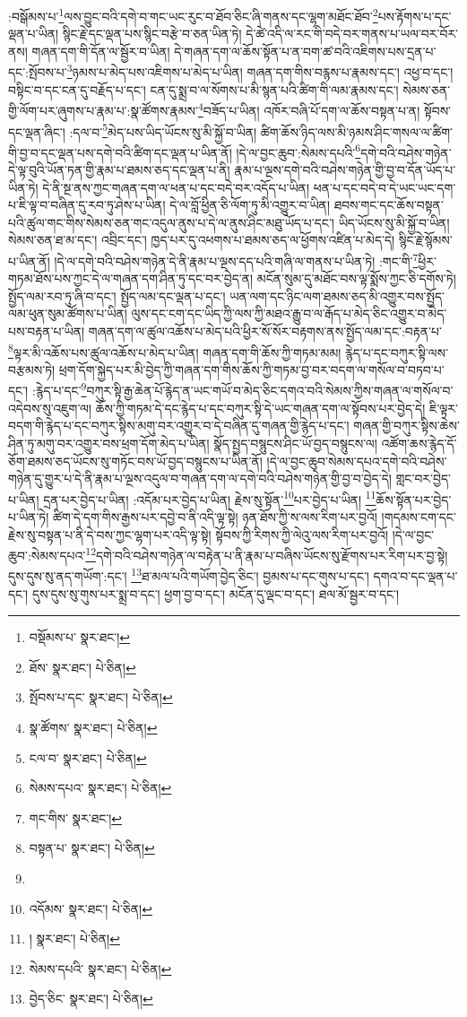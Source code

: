 :བསྒོམས་པ་\footnote{བསྡོམས་པ་  སྣར་ཐང་། }ལས་བྱུང་བའི་དགེ་བ་གང་ཡང་རུང་བ་ཐོབ་ཅིང་ཞི་གནས་དང་ལྷག་མཐོང་ཐོབ་\footnote{ཐོས་  སྣར་ཐང་།  པེ་ཅིན། }པས་རྟོགས་པ་དང་ལྡན་པ་ཡིན། སྙིང་རྗེ་དང་ལྡན་པས་སྙིང་བརྩེ་བ་ཅན་ཡིན་ཏེ། དེ་ཚེ་འདི་ལ་རང་གི་བདེ་བར་གནས་པ་ཡལ་བར་བོར་ནས། གཞན་དག་གི་དོན་ལ་སྦྱོར་བ་ཡིན། དེ་གཞན་དག་ལ་ཆོས་སྟོན་པ་ན་བག་ཚ་བའི་འཇིགས་པས་དྲན་པ་དང་:སྤོབས་པ་\footnote{སྤོབས་པ་དང་  སྣར་ཐང་།  པེ་ཅིན། }ཉམས་པ་མེད་པས་འཇིགས་པ་མེད་པ་ཡིན། གཞན་དག་གིས་བརྙས་པ་རྣམས་དང་། འཕྱ་བ་དང་། བསྟིང་བ་དང་ངན་དུ་བརྗོད་པ་དང་། ངན་དུ་སྨྲ་བ་ལ་སོགས་པ་མི་སྙན་པའི་ཚིག་གི་ལམ་རྣམས་དང་། སེམས་ཅན་གྱི་ལོག་པར་ཞུགས་པ་རྣམ་པ་:སྣ་ཚོགས་རྣམས་\footnote{སྣ་ཚོགས་  སྣར་ཐང་།  པེ་ཅིན། }བཟོད་པ་ཡིན། འཁོར་བཞི་པོ་དག་ལ་ཆོས་བསྟན་པ་ན། སྟོབས་དང་ལྡན་ཞིང་། :དལ་བ་\footnote{ངལ་བ་  སྣར་ཐང་།  པེ་ཅིན། }མེད་པས་ཡིད་ཡོངས་སུ་མི་སྐྱོ་བ་ཡིན། ཚིག་ཆོས་ཉིད་ལས་མི་ཉམས་ཤིང་གསལ་ལ་ཚིག་གི་བྱ་བ་དང་ལྡན་པས་དགེ་བའི་ཚིག་དང་ལྡན་པ་ཡིན་ནོ། །དེ་ལ་བྱང་ཆུབ་:སེམས་དཔའི་\footnote{སེམས་དཔའ་  སྣར་ཐང་།  པེ་ཅིན། }དགེ་བའི་བཤེས་གཉེན་དེ་ལྟ་བུའི་ཡོན་ཏན་གྱི་རྣམ་པ་ཐམས་ཅད་དང་ལྡན་པ་ནི། རྣམ་པ་ལྔས་དགེ་བའི་བཤེས་གཉེན་གྱི་བྱ་བ་དོན་ཡོད་པ་ཡིན་ཏེ། དེ་ནི་སྔ་ནས་ཀྱང་གཞན་དག་ལ་ཕན་པ་དང་བདེ་བར་འདོད་པ་ཡིན། ཕན་པ་དང་བདེ་བ་དེ་ཡང་ཡང་དག་པ་ཇི་ལྟ་བ་བཞིན་དུ་རབ་ཏུ་ཤེས་པ་ཡིན། དེ་ལ་བློ་ཕྱིན་ཅི་ལོག་ཏུ་མི་འགྱུར་བ་ཡིན། ཐབས་གང་དང་ཆོས་བསྟན་པའི་ཚུལ་གང་གིས་སེམས་ཅན་གང་འདུལ་ནུས་པ་དེ་ལ་ནུས་ཤིང་མཐུ་ཡོད་པ་དང་། ཡིད་ཡོངས་སུ་མི་སྐྱོ་བ་ཡིན། སེམས་ཅན་ཐ་མ་དང་། འབྲིང་དང་། ཁྱད་པར་དུ་འཕགས་པ་ཐམས་ཅད་ལ་ཕྱོགས་འཛིན་པ་མེད་དེ། སྙིང་རྗེ་སྙོམས་པ་ཡིན་ནོ། །དེ་ལ་དགེ་བའི་བཤེས་གཉེན་དེ་ནི་རྣམ་པ་ལྔས་དད་པའི་གཞི་ལ་གནས་པ་ཡིན་ཏེ། :གང་གི་\footnote{གང་གིས་  སྣར་ཐང་། }ཕྱིར་གཏམ་ཐོས་པས་ཀྱང་དེ་ལ་གཞན་དག་ཤིན་ཏུ་དང་བར་བྱེད་ན། མངོན་སུམ་དུ་མཐོང་བས་ལྟ་སྨོས་ཀྱང་ཅི་དགོས་ཏེ། སྤྱོད་ལམ་རབ་ཏུ་ཞི་བ་དང་། སྤྱོད་ལམ་དང་ལྡན་པ་དང་། ཡན་ལག་དང་ཉིང་ལག་ཐམས་ཅད་མི་འགྱུར་བས་སྤྱོད་ལམ་ཕུན་སུམ་ཚོགས་པ་ཡིན། ལུས་དང་ངག་དང་ཡིད་ཀྱི་ལས་ཀྱི་མཐའ་རྒྱུ་བ་ལ་རྒོད་པ་མེད་ཅིང་འགྱུར་བ་མེད་པས་བརྟན་པ་ཡིན། གཞན་དག་ལ་ཚུལ་འཆོས་པ་མེད་པའི་ཕྱིར་སོ་སོར་བརྟགས་ནས་སྤྱོད་ལམ་དང་:བརྟན་པ་\footnote{བསྟན་པ་  སྣར་ཐང་།  པེ་ཅིན། }ལྟར་མི་འཆོས་པས་ཚུལ་འཆོས་པ་མེད་པ་ཡིན། གཞན་དག་གི་ཆོས་ཀྱི་གཏམ་མམ། རྙེད་པ་དང་བཀུར་སྟི་ལས་བརྩམས་ཏེ། ཕྲག་དོག་སྐྱེད་པར་མི་བྱེད་ཀྱི་གཞན་དག་གིས་ཆོས་ཀྱི་གཏམ་བྱ་བར་བདག་ལ་གསོལ་བ་བཏབ་པ་དང་། :རྙེད་པ་དང་\footnote{}བཀུར་སྟི་རྒྱ་ཆེན་པོ་རྙེད་ན་ཡང་གཡོ་བ་མེད་ཅིང་དགའ་བའི་སེམས་ཀྱིས་གཞན་ལ་གསོལ་བ་འདེབས་སུ་འཇུག་ལ། ཆོས་ཀྱི་གཏམ་དེ་དང་རྙེད་པ་དང་བཀུར་སྟི་དེ་ཡང་གཞན་དག་ལ་སྟོབས་པར་བྱེད་དེ། ཇི་ལྟར་བདག་གི་རྙེད་པ་དང་བཀུར་སྟིས་མགུ་བར་འགྱུར་བ་དེ་བཞིན་དུ་གཞན་གྱི་རྙེད་པ་དང་། གཞན་གྱི་བཀུར་སྟིས་ཆེས་ཤིན་ཏུ་མགུ་བར་འགྱུར་བས་ཕྲག་དོག་མེད་པ་ཡིན། སྣོད་སྤྱད་བསྙུངས་ཤིང་ཡོ་བྱད་བསྙུངས་ལ། འཚོག་ཆས་རྙེད་དོ་ཅོག་ཐམས་ཅད་ཡོངས་སུ་གཏོང་བས་ཡོ་བྱད་བསྙུངས་པ་ཡིན་ནོ། །དེ་ལ་བྱང་ཆུབ་སེམས་དཔའ་དགེ་བའི་བཤེས་གཉེན་དུ་གྱུར་པ་དེ་ནི་རྣམ་པ་ལྔས་འདུལ་བ་གཞན་དག་ལ་དགེ་བའི་བཤེས་གཉེན་གྱི་བྱ་བ་བྱེད་དེ། གླང་བར་བྱེད་པ་ཡིན། དྲན་པར་བྱེད་པ་ཡིན། :འདོམ་པར་བྱེད་པ་ཡིན། རྗེས་སུ་སྟོན་\footnote{འདོམས་  སྣར་ཐང་།  པེ་ཅིན། }པར་བྱེད་པ་ཡིན། \footnote{།    སྣར་ཐང་།  པེ་ཅིན། }ཆོས་སྟོན་པར་བྱེད་པ་ཡིན་ཏེ། ཚིག་དེ་དག་གིས་རྒྱས་པར་དབྱེ་བ་ནི་འདི་ལྟ་སྟེ། ཉན་ཐོས་ཀྱི་ས་ལས་རིག་པར་བྱའོ། །གདམས་ངག་དང་རྗེས་སུ་བསྟན་པ་ནི་དེ་བས་ཀྱང་ལྷག་པར་འདི་ལྟ་སྟེ། སྟོབས་ཀྱི་རིགས་ཀྱི་ལེའུ་ལས་རིག་པར་བྱའོ། །དེ་ལ་བྱང་ཆུབ་:སེམས་དཔའ་\footnote{སེམས་དཔའི་  སྣར་ཐང་།  པེ་ཅིན། }དགེ་བའི་བཤེས་གཉེན་ལ་བརྟེན་པ་ནི་རྣམ་པ་བཞིས་ཡོངས་སུ་རྫོགས་པར་རིག་པར་བྱ་སྟེ། དུས་དུས་སུ་ནད་གཡོག་:དང་། \footnote{བྱེད་ཅིང་  སྣར་ཐང་།  པེ་ཅིན། }ཐ་མལ་པའི་གཡོག་བྱེད་ཅིང་། བྱམས་པ་དང་གུས་པ་དང་། དགའ་བ་དང་ལྡན་པ་དང་། དུས་དུས་སུ་གུས་པར་སྨྲ་བ་དང་། ཕྱག་བྱ་བ་དང་། མངོན་དུ་ལྡང་བ་དང་། ཐལ་མོ་སྦྱར་བ་དང་། 